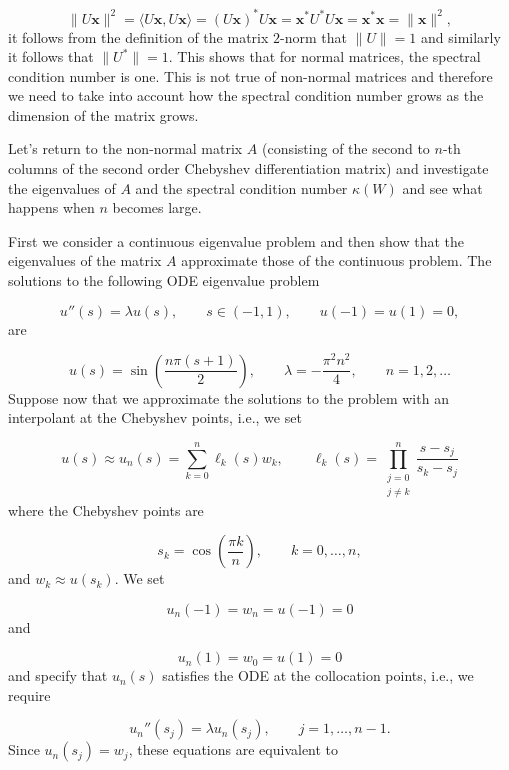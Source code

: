 \documentclass[12pt,a4paper]{article}
\begin{document}
\[
\| U\mathbf{x} \|^2 = \langle U\mathbf{x},  U\mathbf{x} \rangle = \left( U\mathbf{x} \right)^* U\mathbf{x} = \mathbf{x}^*U^*U\mathbf{x} = \mathbf{x}^*\mathbf{x} = \| \mathbf{x} \|^2,
\]
it follows from the definition of the matrix $2$-norm that $\| U \| = 1$ and similarly it follows that $\| U^* \| = 1$.  This shows that for normal matrices, the spectral condition number is one. This is not true of non-normal matrices and therefore we need to take into account how the spectral condition number grows as the dimension of the matrix grows.

Let's return to the non-normal matrix $A$ (consisting of the second to $n$-th columns of the second order Chebyshev differentiation matrix) and investigate the eigenvalues of $A$ and the spectral condition number $\kappa(W)$ and see what happens when $n$ becomes large.

First we consider a continuous eigenvalue problem and then show that the eigenvalues of the matrix $A$ approximate those of the continuous problem.  The solutions to the following ODE eigenvalue problem

\[
u''(s) = \lambda u(s),\qquad s \in (-1, 1), \qquad u(-1) = u(1) = 0,
\]
are

\[
u(s)  = \sin\left(\frac{n\pi(s+1)}{2}\right), \qquad \lambda = -\frac{\pi^2 n^2}{4}, \qquad n = 1, 2, \ldots
\]
Suppose now that we approximate the solutions to the problem with an interpolant at the Chebyshev points, i.e., we set

\[
u(s) \approx u_{n}(s) = \sum_{k = 0}^{n}\ell_k(s)w_k, \qquad \ell_k(s) = \prod_{\substack{j=0\\ j \neq k}}^{n}\frac{s-s_j}{s_k-s_j}
\]
where the Chebyshev points are

\[
s_k = \cos\left(\frac{\pi k}{n} \right), \qquad k = 0, \ldots, n,
\]
and $w_k \approx u(s_k)$.   We set 

\[
u_n(-1) = w_n = u(-1) = 0
\]
and

\[
u_n(1) = w_0 = u(1) = 0
\]
and specify that $u_n(s)$ satisfies the ODE at the collocation points, i.e., we require

\[
u_n''(s_j) = \lambda u_n(s_j), \qquad j = 1, \ldots, n-1.
\]
Since $u_n(s_j) = w_j$, these equations are equivalent to
\end{document}
